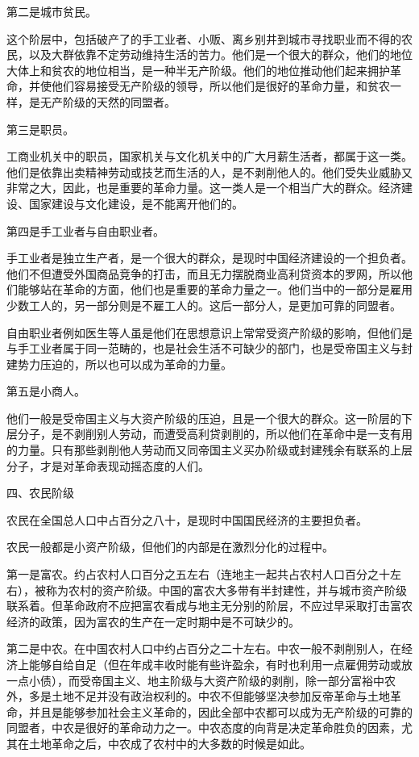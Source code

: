 \documentclass[UTF8, 12pt, a4paper]{ctexrep}
\begin{document}
第二是城市贫民。

这个阶层中，包括破产了的手工业者、小贩、离乡别井到城市寻找职业而不得的农民，以及大群依靠不定劳动维持生活的苦力。他们是一个很大的群众，他们的地位大体上和贫农的地位相当，是一种半无产阶级。他们的地位推动他们起来拥护革命，并使他们容易接受无产阶级的领导，所以他们是很好的革命力量，和贫农一样，是无产阶级的天然的同盟者。

第三是职员。

工商业机关中的职员，国家机关与文化机关中的广大月薪生活者，都属于这一类。他们是依靠出卖精神劳动或技艺而生活的人，是不剥削他人的。他们受失业威胁又非常之大，因此，也是重要的革命力量。这一类人是一个相当广大的群众。经济建设、国家建设与文化建设，是不能离开他们的。

第四是手工业者与自由职业者。

手工业者是独立生产者，是一个很大的群众，是现时中国经济建设的一个担负者。他们不但遭受外国商品竞争的打击，而且无力摆脱商业高利贷资本的罗网，所以他们能够站在革命的方面，他们也是重要的革命力量之一。他们当中的一部分是雇用少数工人的，另一部分则是不雇工人的。这后一部分人，是更加可靠的同盟者。

自由职业者例如医生等人虽是他们在思想意识上常常受资产阶级的影响，但他们是与手工业者属于同一范畴的，也是社会生活不可缺少的部门，也是受帝国主义与封建势力压迫的，所以也可以成为革命的力量。

第五是小商人。

他们一般是受帝国主义与大资产阶级的压迫，且是一个很大的群众。这一阶层的下层分子，是不剥削别人劳动，而遭受高利贷剥削的，所以他们在革命中是一支有用的力量。只有那些剥削他人劳动而又同帝国主义买办阶级或封建残余有联系的上层分子，才是对革命表现动摇态度的人们。

四、农民阶级

农民在全国总人口中占百分之八十，是现时中国国民经济的主要担负者。

农民一般都是小资产阶级，但他们的内部是在激烈分化的过程中。

第一是富农。约占农村人口百分之五左右（连地主一起共占农村人口百分之十左右），被称为农村的资产阶级。中国的富农大多带有半封建性，并与城市资产阶级联系着。但革命政府不应把富农看成与地主无分别的阶层，不应过早采取打击富农经济的政策，因为富农的生产在一定时期中是不可缺少的。

第二是中农。在中国农村人口中约占百分之二十左右。中农一般不剥削别人，在经济上能够自给自足（但在年成丰收时能有些许盈余，有时也利用一点雇佣劳动或放一点小债），而受帝国主义、地主阶级与大资产阶级的剥削，除一部分富裕中农外，多是土地不足并没有政治权利的。中农不但能够坚决参加反帝革命与土地革命，并且是能够参加社会主义革命的，因此全部中农都可以成为无产阶级的可靠的同盟者，中农是很好的革命动力之一。中农态度的向背是决定革命胜负的因素，尤其在土地革命之后，中农成了农村中的大多数的时候是如此。
\end{document}
